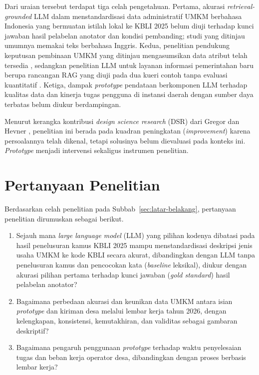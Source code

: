 Dari uraian tersebut terdapat tiga celah pengetahuan. Pertama, akurasi \textit{retrieval-grounded} LLM dalam menstandardisasi data administratif UMKM berbahasa Indonesia yang bermuatan istilah lokal ke KBLI 2025 belum diuji terhadap kunci jawaban hasil pelabelan anotator dan kondisi pembanding; studi yang ditinjau umumnya memakai teks berbahasa Inggris. Kedua, penelitian pendukung keputusan pembinaan UMKM yang ditinjau mengasumsikan data atribut telah tersedia \cite{khotimah2024hybrid}, sedangkan penelitian LLM untuk layanan informasi pemerintahan baru berupa rancangan RAG yang diuji pada dua kueri contoh tanpa evaluasi kuantitatif \cite{papageorgiou2024egov}. Ketiga, dampak \textit{prototype} pendataan berkomponen LLM terhadap kualitas data dan kinerja tugas pengguna di instansi daerah dengan sumber daya terbatas belum diukur berdampingan.

Menurut kerangka kontribusi \textit{design science research} (DSR) dari Gregor dan Hevner \cite{gregor2013positioning}, penelitian ini berada pada kuadran peningkatan (\textit{improvement}) karena persoalannya telah dikenal, tetapi solusinya belum dievaluasi pada konteks ini. \textit{Prototype} menjadi intervensi sekaligus instrumen penelitian.

\section{Pertanyaan Penelitian}
\label{sec:pertanyaan-penelitian}

Berdasarkan celah penelitian pada Subbab~\ref{sec:latar-belakang}, pertanyaan penelitian dirumuskan sebagai berikut.

\begin{enumerate}[label=\textbf{RQ\arabic*}:, leftmargin=*]
  \item Sejauh mana \textit{large language model} (LLM) yang pilihan kodenya dibatasi pada hasil penelusuran kamus KBLI 2025 mampu menstandardisasi deskripsi jenis usaha UMKM ke kode KBLI secara akurat, dibandingkan dengan LLM tanpa penelusuran kamus dan pencocokan kata (\textit{baseline} leksikal), diukur dengan akurasi pilihan pertama terhadap kunci jawaban (\textit{gold standard}) hasil pelabelan anotator?
  \item Bagaimana perbedaan akurasi dan keunikan data UMKM antara isian \textit{prototype} dan kiriman desa melalui lembar kerja tahun 2026, dengan kelengkapan, konsistensi, kemutakhiran, dan validitas sebagai gambaran deskriptif?
  \item Bagaimana pengaruh penggunaan \textit{prototype} terhadap waktu penyelesaian tugas dan beban kerja operator desa, dibandingkan dengan proses berbasis lembar kerja?
\end{enumerate}

